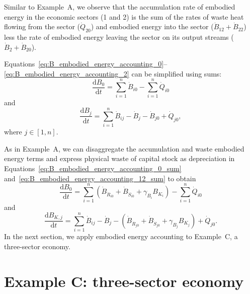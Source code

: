 Similar to Example~A, we observe that the accumulation rate 
of embodied energy
in the economic sectors (1 and 2) 
is the sum of the rates of waste heat flowing from the sector 
($\dot{Q}_{20}$) and embodied energy into the sector 
($\dot{B}_{12} + \dot{B}_{22}$) 
less the rate of embodied energy leaving the sector 
on its output streams ($\dot{B}_{2} + \dot{B}_{20}$).

Equations~\ref{eq:B_embodied_energy_accounting_0}--\ref{eq:B_embodied_energy_accounting_2}
can be simplified using sums:
%
\begin{equation} \label{eq:B_embodied_energy_accounting_0_sum}
	\frac{\mathrm{d}B_{0}}{\mathrm{d}t} 
	= \sum\limits_{i=1}^n\dot{B}_{i0} 
	- \sum\limits_{i=1}^n\dot{Q}_{i0} 
\end{equation}
%
and
%
\begin{equation} \label{eq:B_embodied_energy_accounting_12_sum}
	\frac{\mathrm{d}B_{j}}{\mathrm{d}t} 
	= \sum\limits_{i=1}^n\dot{B}_{ij} 
	- \dot{B}_{j}
	- \dot{B}_{j0} 
	+ \dot{Q}_{j0},
\end{equation}
%
where $j \in [1, n]$.

As in Example~A, 
we can disaggregate the accumulation and waste embodied energy terms 
and express physical waste of capital stock as depreciation 
in Equations~\ref{eq:B_embodied_energy_accounting_0_sum}
and~\ref{eq:B_embodied_energy_accounting_12_sum}
to obtain
%
\begin{equation} \label{eq:B_embodied_energy_accounting_0_with_depreciation}
	\frac{\mathrm{d}B_{0}}{\mathrm{d}t} 
	= \sum\limits_{i=1}^n 
		\left( \dot{B}_{\dot{R}_{i0}} 
				+ \dot{B}_{\dot{S}_{i0}} 
				+ \gamma_{B_{i}} B_{K_{i}} \right)
	- \sum\limits_{i=1}^n\dot{Q}_{i0} 
\end{equation}
%
and
%
\begin{equation} \label{eq:B_embodied_energy_accounting_12_with_depreciation}
	\frac{\mathrm{d}B_{K,j}}{\mathrm{d}t} 
	= \sum\limits_{i=1}^n\dot{B}_{ij} 
	- \dot{B}_{j}
	- \left( \dot{B}_{\dot{R}_{j0}}
		+ \dot{B}_{\dot{S}_{j0}}
		+ \gamma_{B_{j}} B_{K_{j}} \right)
	+ \dot{Q}_{j0}.
\end{equation}
%
In the next section, we apply embodied energy accounting to 
Example~C, a three-sector economy.


\section{Example C: three-sector economy} %
\label{sec:Embodied_Energy_Example_C}

